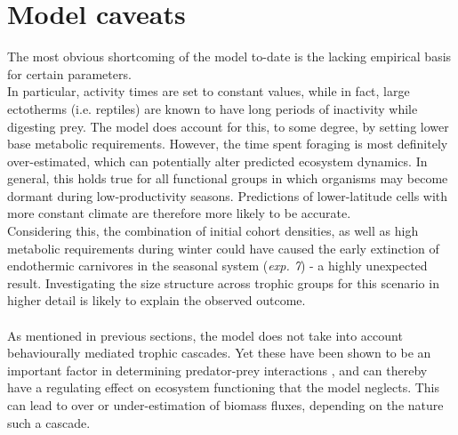 \section{Model caveats}
The most obvious shortcoming of the model to-date is the lacking empirical basis for certain parameters. \\
In particular, activity times are set to constant values, while in fact, large ectotherms (i.e. reptiles) are known to have long periods of inactivity while digesting prey. 
The model does account for this, to some degree, by setting lower base metabolic requirements. However, the time spent foraging is most definitely over-estimated, which can potentially alter predicted ecosystem dynamics. 
In general, this holds true for all functional groups in which organisms may become dormant during low-productivity seasons. Predictions of lower-latitude cells with more constant climate are therefore more likely to be accurate. \\
Considering this, the combination of initial cohort densities, as well as high metabolic requirements during winter could have  caused the early extinction of endothermic carnivores in the seasonal system (\textit{exp. 7}) - a highly unexpected result. Investigating the size structure across trophic groups for this scenario in higher detail is likely to explain the observed outcome.
\\\\
As mentioned in previous sections, the model does not take into account behaviourally mediated trophic cascades. Yet these have been shown to be an important factor in determining predator-prey interactions \citep[e.g][]{Fortin2005,Duffy2007,Beschta2009}, and can thereby have a regulating effect on ecosystem functioning that the model neglects. This can lead to over or under-estimation of biomass fluxes, depending on the nature such a cascade.\\\\
